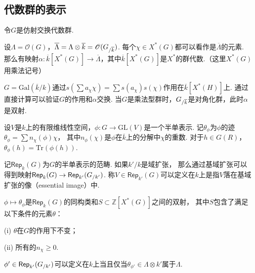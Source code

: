 
\subsection{代数群的表示}

令$G$是仿射交换代数群.

设$\Lambda = \mathscr{O}(G)$，$\overline{\Lambda} = \Lambda \otimes \overline{k} = \mathscr{O}({G}_{/\overline{k}})$.
每个$\chi\in X^{*}(G)$都可以看作是$\overline{\Lambda}$的元素.
那么有映射$\alpha: \overline{k}[X^{*}(G)] \to \overline{\Lambda}$，其中$\overline{k}[X^{*}(G)]$是$X^{*}$的群代数.（这里$X^{*}(G)$用乘法记号）

$G = \mathrm{Gal}(\overline{k}/k)$通过$s(\sum a_{\chi} \chi) = \sum s(a_{\chi}) s(\chi)$作用在$\overline{k}[X^{*}(H)]$上.
通过直接计算可以验证$G$的作用和$\alpha$交换.
当$G$是乘法型群时，${G}_{/\overline{k}}$是对角化群，此时$\alpha$是双射.

设$V$是$k$上的有限维线性空间，$\phi: G\to \mathrm{GL}(V)$是一个半单表示.
记$\theta_{\phi}$为$\phi$的迹$\theta_{\phi} = \sum n_{\chi}(\phi)\chi$，
其中$n_{\phi}(\chi)$是$\phi$在$\overline{k}$上的分解中$\chi$的重数.
对于$h\in G(R)$，$\theta_{\phi}(h) = \mathrm{Tr}(\phi(h))$.

记$\mathsf{Rep}_{k}(G)$为$G$的半单表示的范畴. 如果$k'/k$是域扩张，
那么通过基域扩张可以得到映射$\mathsf{Rep}_{k}(G)\to \mathsf{Rep}_{k'}({G}_{/k'})$.
称$V\in \mathsf{Rep}_{k'}(G)$可以定义在$k$上是指$V$落在基域扩张的像（essential image）中.

\begin{cprop}
    $\phi\mapsto \theta_{\phi}$是$\mathsf{Rep}_{k}(G)$的同构类和$S \subset \mathbb{Z}[X^{*}(G)]$之间的双射，
    其中$S$包含了满足以下条件的元素$\theta$：

    (i) $\theta$在$G$的作用下不变；

    (ii) 所有的$n_{\chi}\geq 0$.
\end{cprop}

\begin{ccor}
    $\phi'\in \mathsf{Rep}_{k'}({G}_{/k'})$可以定义在$k$上当且仅当$\theta_{\phi'}\in \Lambda \otimes k'$属于$\Lambda$.
\end{ccor}
